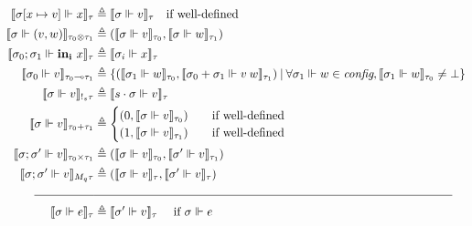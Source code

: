 \begin{definition}
\begin{equation}
\begin{aligned}[c]
  \llbracket \sigma [x \mapsto v] \Vdash x \rrbracket_{\tau} &\triangleq
    \llbracket \sigma \Vdash v \rrbracket_{\tau} \quad \text{if well-defined} \\
  \llbracket \sigma \Vdash (v, w) \rrbracket_{\tau_0 \otimes \tau_1} &\triangleq
    (\llbracket \sigma \Vdash v \rrbracket_{\tau_0}, \llbracket \sigma \Vdash w
    \rrbracket_{\tau_1}) \\
  \llbracket \sigma_0; \sigma_1 \Vdash \mathbf{in_i} \ x \rrbracket_{\tau}
    &\triangleq \llbracket \sigma_i \Vdash x \rrbracket_{\tau} \\
  \llbracket \sigma_0 \Vdash v \rrbracket_{\tau_0 \multimap \tau_1}
    &\triangleq \{ (\llbracket \sigma_1 \Vdash w \rrbracket_{\tau_0}, \llbracket
    \sigma_0 + \sigma_1 \Vdash v \> w \rrbracket_{\tau_1}) \> | \>
    \forall \sigma_1 \Vdash w \in \textit{config}, \llbracket \sigma_1 \Vdash w
    \rrbracket_{\tau_0} \not= \bot \} \\
  \llbracket \sigma \Vdash v \rrbracket_{!_s \tau} &\triangleq \llbracket s
    \cdot \sigma
    \Vdash v \rrbracket_\tau \\
  \llbracket \sigma \Vdash v \rrbracket_{\tau_0 + \tau_1} &\triangleq
    \begin{cases}
      (0, \llbracket \sigma \Vdash v \rrbracket_{\tau_0}) \quad &\text{if well-defined} \\
      (1, \llbracket \sigma \Vdash v \rrbracket_{\tau_1}) \quad &\text{if well-defined}
    \end{cases} \\
  \llbracket \sigma; \sigma' \Vdash v \rrbracket_{\tau_0 \times \tau_1}
    &\triangleq (\llbracket \sigma \Vdash v \rrbracket_{\tau_0}, \llbracket
    \sigma' \Vdash v \rrbracket_{\tau_1}) \\
  \llbracket \sigma; \sigma' \Vdash v \rrbracket_{M_q \tau} &\triangleq
    (\llbracket \sigma \Vdash v \rrbracket_{\tau}, \llbracket \sigma' \Vdash v
    \rrbracket_{\tau}) \\
  \rule{5em}{0.4pt}&\rule{30em}{0.4pt}\\
  \llbracket \sigma \Vdash e \rrbracket_{\tau} &\triangleq \llbracket \sigma'
    \Vdash v\rrbracket_{\tau} \quad{\text{ if } \sigma \Vdash e
}
\end{aligned}
\end{equation}
\end{definition}
